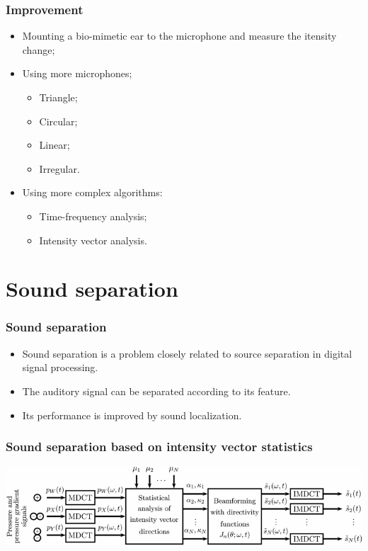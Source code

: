 \documentclass{beamer}
\begin{document}
\begin{frame}
\frametitle{Improvement}
\begin{itemize}
  \item Mounting a bio-mimetic ear to the microphone and measure the itensity change;
  \item Using more microphones;
    \begin{itemize}
      \item Triangle;
      \item Circular;
      \item Linear;
      \item Irregular.
    \end{itemize}
  \item Using more complex algorithms:
    \begin{itemize}
      \item Time-frequency analysis;
      \item Intensity vector analysis.
    \end{itemize}
\end{itemize}
\end{frame}


\section{Sound separation}

\begin{frame}
\frametitle{Sound separation}
\begin{itemize}
  \item Sound separation is a problem closely related to source separation in digital signal processing.
  \item The auditory signal can be separated according to its feature.
  \item Its performance is improved by sound localization.
\end{itemize}
\end{frame}

\begin{frame}
\frametitle{Sound separation based on intensity vector statistics\cite{gunel_acoustic_2008}}
\begin{center}
  \includegraphics[width=\textwidth]{flow}
\end{center}
\end{frame}
\end{document}
